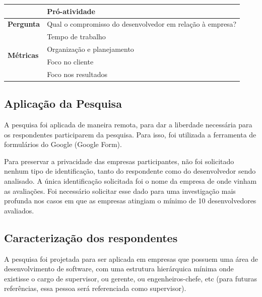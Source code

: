 \begin{table}[h]
\begin{tabular}{|p{2cm}|p{6.25cm}|p{6.25cm}|}
		& \multicolumn{2}{l|}{Pró-atividade}                                                                      \\ \hline\hline
		\textbf{Pergunta}                  & \multicolumn{2}{l|}{\parbox{12cm}{Qual o compromisso do desenvolvedor em relação à empresa?}}                          \\ \hline
		\multirow{4}{*}{\textbf{Métricas}} & \multicolumn{2}{l|}{Tempo de trabalho}                                                                  \\ \cline{2-3} 
		& \multicolumn{2}{l|}{Organização e planejamento}                                                         \\ \cline{2-3} 
		& \multicolumn{2}{l|}{Foco no cliente}                                                                    \\ \cline{2-3} 
		& \multicolumn{2}{l|}{Foco nos resultados}                                                                \\ \hline
	\end{tabular}
\end{table}

\subsection{Aplicação da Pesquisa}

A pesquisa foi aplicada de maneira remota, para dar a liberdade necessária para os respondentes participarem da pesquisa. Para isso, foi utilizada a ferramenta de formulários do Google (Google Form).

Para preservar a privacidade das empresas participantes, não foi solicitado nenhum tipo de identificação, tanto do respondente como do desenvolvedor sendo analisado. A única identificação solicitada foi o nome da empresa de onde vinham as avaliações. Foi necessário solicitar esse dado para uma investigação mais profunda nos casos em que as empresas atingiam o mínimo de 10 desenvolvedores avaliados.

\subsection{Caracterização dos respondentes}

A pesquisa foi projetada para ser aplicada em empresas que possuem uma área de desenvolvimento de software, com uma estrutura hierárquica mínima onde existisse o cargo de supervisor, ou gerente, ou engenheiros-chefe, etc (para futuras referências, essa pessoa será referenciada como supervisor).

